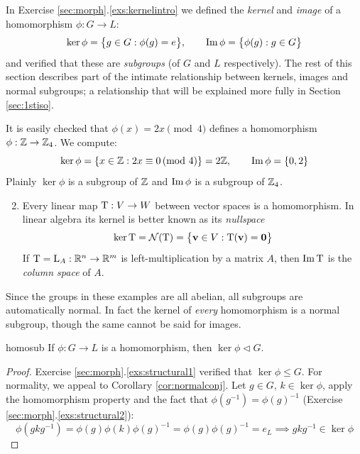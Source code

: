
In Exercise \ref*{sec:morph}.\ref{exs:kernelintro} we defined the \emph{kernel} and \emph{image} of a homomorphism $\phi:G\to L$:
\[
	\ker\phi =\bigl\{g\in G:\phi(g)=e\bigr\},\qquad \operatorname{Im}\phi=\bigl\{\phi(g):g\in G\bigr\}
\]
and verified that these are \emph{subgroups} (of $G$ and $L$ respectively). The rest of this section describes part of the intimate relationship between kernels, images and normal subgroups; a relationship that will be explained more fully in Section \ref{sec:1stiso}.


\begin{examples}{}{}
	\exstart It is easily checked that $\phi(x)=2x\pmod 4$ defines a homomorphism $\phi:\mathbb{Z}\to\mathbb{Z}_4$. We compute:
	\[
		\ker\phi=\{x\in\mathbb{Z}:2x\equiv 0\negthickspace\pmod 4\}=2\mathbb{Z},
		\qquad
		\operatorname{Im}\phi=\{0,2\}
	\]
	Plainly $\ker\phi$ is a subgroup of $\mathbb{Z}$ and $\operatorname{Im}\phi$ is a subgroup of $\mathbb{Z}_4$.
	\begin{enumerate}\setcounter{enumi}{1}
	  \item Every linear map $\mathrm{T}:V\to W$ between vector spaces is a homomorphism. In linear algebra its kernel is better known as its \emph{nullspace}
		\[
			\ker\mathrm{T}=\mathcal N(\mathrm{T})=\bigl\{{\mathbf{v}}\in V:\mathrm{T}({\mathbf{v}})=\mathbf{0}\bigr\}
		\]
		If $\mathrm{T}=\mathrm{L}_A:\mathbb{R}^n\to \mathbb{R}^m$ is left-multiplication by a matrix $A$, then $\operatorname{Im}\mathrm{T}$ is the \emph{column space} of $A$.
	\end{enumerate}
\end{examples}

Since the groups in these examples are all abelian, all subgroups are automatically normal. In fact the kernel of \emph{every} homomorphism is a normal subgroup, though the same cannot be said for images.

\begin{lemm}{}{homosub}
	If $\phi:G\to L$ is a homomorphism, then $\ker\phi\triangleleft G$.
\end{lemm}

\begin{proof}
	Exercise \ref*{sec:morph}.\ref{exs:structural1} verified that $\ker\phi\le G$. For normality, we appeal to Corollary \ref{cor:normalconj}. Let $g\in G$, $k\in\ker\phi$, apply the homomorphism property and the fact that $\phi(g^{-1})=\phi(g)^{-1}$ (Exercise \ref{sec:morph}.\ref{exs:structural2}):
	\[
		\phi(gk g^{-1})=\phi(g)\phi(k)\phi(g)^{-1}
	  =\phi(g)\phi(g)^{-1}=e_L
	  \implies gk g^{-1}\in\ker\phi\tag*{\qedhere}
	\]
\end{proof}


